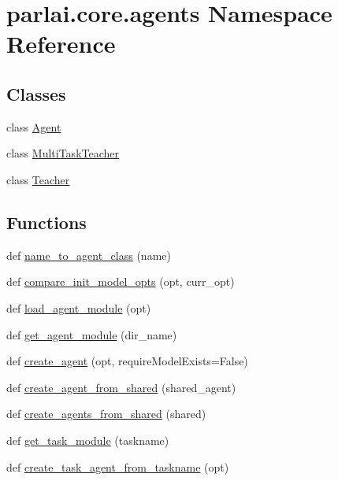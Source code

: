 \hypertarget{namespaceparlai_1_1core_1_1agents}{}\section{parlai.\+core.\+agents Namespace Reference}
\label{namespaceparlai_1_1core_1_1agents}
\subsection*{Classes}
\begin{DoxyCompactItemize}
\item 
class \hyperlink{classparlai_1_1core_1_1agents_1_1Agent}{Agent}
\item 
class \hyperlink{classparlai_1_1core_1_1agents_1_1MultiTaskTeacher}{Multi\+Task\+Teacher}
\item 
class \hyperlink{classparlai_1_1core_1_1agents_1_1Teacher}{Teacher}
\end{DoxyCompactItemize}
\subsection*{Functions}
\begin{DoxyCompactItemize}
\item 
def \hyperlink{namespaceparlai_1_1core_1_1agents_a7a5f5076b35ce376d8b46bfb362bfc53}{name\+\_\+to\+\_\+agent\+\_\+class} (name)
\item 
def \hyperlink{namespaceparlai_1_1core_1_1agents_a7eb0ec391b94a2adc51acdf8d2a35a68}{compare\+\_\+init\+\_\+model\+\_\+opts} (opt, curr\+\_\+opt)
\item 
def \hyperlink{namespaceparlai_1_1core_1_1agents_a213df46dd21144eb4c056bb58c294c5d}{load\+\_\+agent\+\_\+module} (opt)
\item 
def \hyperlink{namespaceparlai_1_1core_1_1agents_a14a9d134d76ffd0509e50703d0f2c949}{get\+\_\+agent\+\_\+module} (dir\+\_\+name)
\item 
def \hyperlink{namespaceparlai_1_1core_1_1agents_ad0d54074d4bcc148bb415ab5515a53b5}{create\+\_\+agent} (opt, require\+Model\+Exists=False)
\item 
def \hyperlink{namespaceparlai_1_1core_1_1agents_aa5af5dd1d2f9da491b60348d479b849f}{create\+\_\+agent\+\_\+from\+\_\+shared} (shared\+\_\+agent)
\item 
def \hyperlink{namespaceparlai_1_1core_1_1agents_a5600530545f5e60a79e2d657b5af1d8c}{create\+\_\+agents\+\_\+from\+\_\+shared} (shared)
\item 
def \hyperlink{namespaceparlai_1_1core_1_1agents_a530b987b67a802a8e9c5fa3c24ae942f}{get\+\_\+task\+\_\+module} (taskname)
\item 
def \hyperlink{namespaceparlai_1_1core_1_1agents_ab4473fa54af02b5ab385b41b51dacd10}{create\+\_\+task\+\_\+agent\+\_\+from\+\_\+taskname} (opt)
\end{DoxyCompactItemize}


